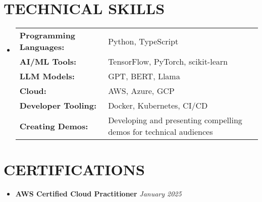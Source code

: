 \documentclass[letterpaper,10pt]{article}
\newcommand{\resumeSubHeadingListStart}{\begin{itemize}[leftmargin=0in,label={}]}
\newcommand{\resumeSubHeadingListEnd}{\end{itemize}}
\begin{document}
\section{TECHNICAL SKILLS}
\resumeSubHeadingListStart
\item \small{\renewcommand{\arraystretch}{1.3}
    \begin{tabularx}{\textwidth}{@{} p{3.5cm} >{\raggedright\arraybackslash}X @{}}
    \textbf{Programming Languages:} & Python, TypeScript \\
    \textbf{AI/ML Tools:} & TensorFlow, PyTorch, scikit-learn \\
    \textbf{LLM Models:} & GPT, BERT, Llama \\
    \textbf{Cloud:} & AWS, Azure, GCP \\
    \textbf{Developer Tooling:} & Docker, Kubernetes, CI/CD \\
    \textbf{Creating Demos:} & Developing and presenting compelling demos for technical audiences
    \end{tabularx}}
\resumeSubHeadingListEnd
\vspace{8pt}

\section{CERTIFICATIONS}
\resumeSubHeadingListStart
\vspace{10pt}
\item \small{\textbf{AWS Certified Cloud Practitioner} \hfill \textit{January 2025}}
\resumeSubHeadingListEnd
\end{document}

